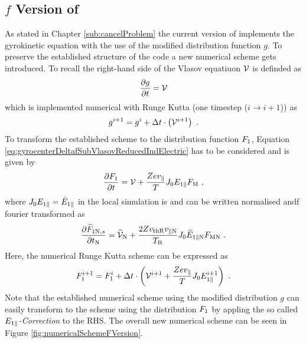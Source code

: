 \subsection{$f$ Version of \gkw}
\label{sub:implementationFVersion}

As stated in Chapter \ref{sub:cancelProblem} the current version of \gkw implements the gyrokinetic equation with the use of the modified distribution function $g$. To preserve the established structure of the code a new numerical scheme gets introduced. To recall the right-hand side of the Vlasov equatiuon $\mathcal{V}$ is definded as
\begin{gather}
    \frac{\partial g}{\partial t} = \mathcal{V}
    \label{eq:rightHandSideRecall}
\end{gather}
which is implemented numerical with Runge Kutta (one timestep ($i \rightarrow i+1$)) as
\begin{gather}
    g^{i+1} = g^{i} + \Delta t \cdot \left(\mathcal{V}^{i+1}\right) ~.
    \label{eq:numericalSchemeModifiedDistribution}
\end{gather}
To transform the established scheme to the distribution function $F_1$, Equation \ref{eq:gyrocenterDeltafSubVlasovReducedIndElectric} has to be considered and is given by
\begin{gather}
    \frac{\partial F_1}{\partial t} = \mathcal{V} + \frac{Ze v_\parallel}{T} J_0 E_{1\parallel} F_\mathrm{M}~,
    \label{eq:gyrocenterDeltafSubVlasovReducedIndElectricRecall}
\end{gather}
where $J_0 E_{1\parallel} = \bar{E}_{1\parallel}$ in the local simulation is and can be written normalised andf fourier transformed as 
\begin{gather}
    \frac{\partial \widehat{F}_{1\mathrm{N},s}}{\partial t_\mathrm{N}} = \widehat{\mathcal{V}}_\mathrm{N} + \frac{2 Z v_{\mathrm{th} \mathrm{R}} v_{\parallel \mathrm{N}}}{T_\mathrm{R}} J_0 \widehat{E}_{1\parallel \mathrm{N}} F_{\mathrm{M} \mathrm{N}}~.
    \label{eq:gyrocenterDeltafSubVlasovReducedIndElectricNorm}
\end{gather}
Here, the numerical Runge Kutta scheme can be expressed as
\begin{gather}
    F_1^{i+1} = F_1^{i} + \Delta t \cdot \left(\mathcal{V}^{i+1} + \frac{Ze v_\parallel}{T} J_0 E_{1\parallel}^{i+1} \right) ~.
    \label{eq:numericalSchemeModifiedDistribution}
\end{gather}
Note that the established numerical scheme using the modified distribution $g$ can easily transform to the scheme using the distribution $F_1$ by appling the so called \textit{$E_{1\parallel}$-Correction} to the RHS. The overall new numerical scheme can be seen in Figure \ref{fig:numericalSchemeFVersion}.


